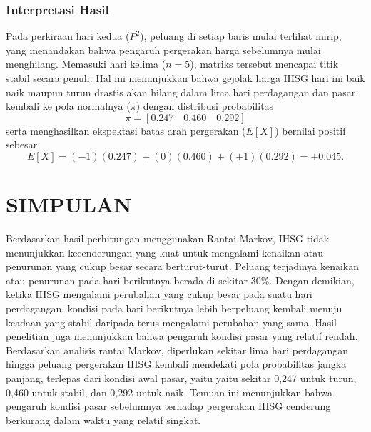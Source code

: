 \documentclass[12pt,a4paper]{article}
\numberwithin{equation}{section}
\begin{document}
\subsubsection{Interpretasi Hasil}
Pada perkiraan hari kedua ($P^2$), peluang di setiap baris mulai terlihat mirip, yang menandakan bahwa pengaruh pergerakan harga sebelumnya mulai menghilang. Memasuki hari kelima ($n=5$), matriks tersebut mencapai titik stabil secara penuh. Hal ini menunjukkan bahwa gejolak harga IHSG hari ini baik naik maupun turun drastis akan hilang dalam lima hari perdagangan dan pasar kembali ke pola normalnya ($\pi$) dengan distribusi probabilitas
$$ \pi = [0.247 \quad 0.460 \quad 0.292] $$
serta menghasilkan ekspektasi batas arah pergerakan ($E[X]$) bernilai positif sebesar
$$ E[X] = (-1)(0.247) + (0)(0.460) + (+1)(0.292) = +0.045. $$

\section{SIMPULAN}
Berdasarkan hasil perhitungan menggunakan Rantai Markov, IHSG tidak menunjukkan kecenderungan yang kuat untuk mengalami kenaikan atau penurunan yang cukup besar secara berturut-turut. Peluang terjadinya kenaikan atau penurunan pada hari berikutnya berada di sekitar 30\%. Dengan demikian, ketika IHSG mengalami perubahan yang cukup besar pada suatu hari perdagangan, kondisi pada hari berikutnya lebih berpeluang kembali menuju keadaan yang stabil daripada terus mengalami perubahan yang sama.
Hasil penelitian juga menunjukkan bahwa pengaruh kondisi pasar yang relatif rendah. Berdasarkan analisis rantai Markov, diperlukan sekitar lima hari perdagangan hingga peluang pergerakan IHSG kembali mendekati pola probabilitas jangka panjang, terlepas dari kondisi awal pasar, yaitu yaitu sekitar 0,247 untuk turun, 0,460 untuk stabil, dan 0,292 untuk naik. Temuan ini menunjukkan bahwa pengaruh kondisi pasar sebelumnya terhadap pergerakan IHSG cenderung berkurang dalam waktu yang relatif singkat.
\end{document}
